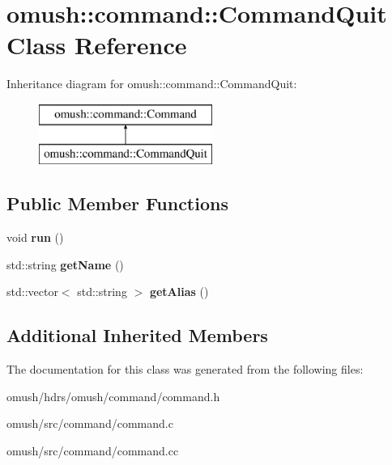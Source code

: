 \hypertarget{classomush_1_1command_1_1_command_quit}{\section{omush\-:\-:command\-:\-:Command\-Quit Class Reference}
\label{classomush_1_1command_1_1_command_quit}
}
Inheritance diagram for omush\-:\-:command\-:\-:Command\-Quit\-:\begin{figure}[H]
\begin{center}
\leavevmode
\includegraphics[height=2.000000cm]{classomush_1_1command_1_1_command_quit}
\end{center}
\end{figure}
\subsection*{Public Member Functions}
\begin{DoxyCompactItemize}
\item 
\hypertarget{classomush_1_1command_1_1_command_quit_a6a65300d98ba048f8b1ff336830b90d1}{void {\bfseries run} ()}\label{classomush_1_1command_1_1_command_quit_a6a65300d98ba048f8b1ff336830b90d1}

\item 
\hypertarget{classomush_1_1command_1_1_command_quit_a859e1a110414d740ff17909c26c50ae9}{std\-::string {\bfseries get\-Name} ()}\label{classomush_1_1command_1_1_command_quit_a859e1a110414d740ff17909c26c50ae9}

\item 
\hypertarget{classomush_1_1command_1_1_command_quit_a7c8093c29c0d8f766afc0fc573bd3374}{std\-::vector$<$ std\-::string $>$ {\bfseries get\-Alias} ()}\label{classomush_1_1command_1_1_command_quit_a7c8093c29c0d8f766afc0fc573bd3374}

\end{DoxyCompactItemize}
\subsection*{Additional Inherited Members}


The documentation for this class was generated from the following files\-:\begin{DoxyCompactItemize}
\item 
omush/hdrs/omush/command/command.\-h\item 
omush/src/command/command.\-c\item 
omush/src/command/command.\-cc\end{DoxyCompactItemize}
